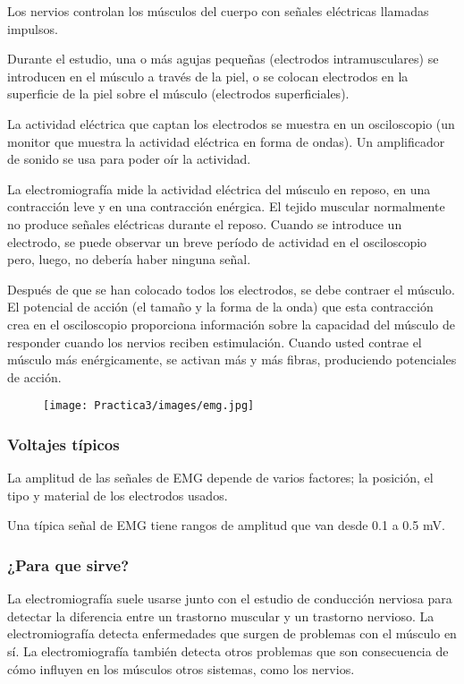 \documentclass[12pt]{article}
\begin{document}
	Los nervios controlan los músculos del cuerpo con señales eléctricas llamadas impulsos. 
	
	Durante el estudio, una o más agujas pequeñas (electrodos intramusculares) se introducen en el músculo a través de la piel, o se colocan electrodos en la superficie de la piel sobre el músculo (electrodos superficiales). 
	
	La actividad eléctrica que captan los electrodos se muestra en un osciloscopio (un monitor que muestra la actividad eléctrica en forma de ondas). Un amplificador de sonido se usa para poder oír la actividad.
	
	La electromiografía mide la actividad eléctrica del músculo en reposo, en una contracción leve y en una contracción enérgica. El tejido muscular normalmente no produce señales eléctricas durante el reposo. Cuando se introduce un electrodo, se puede observar un breve período de actividad en el osciloscopio pero, luego, no debería haber ninguna señal.
	
	Después de que se han colocado todos los electrodos, se debe contraer el músculo. El potencial de acción (el tamaño y la forma de la onda) que esta contracción crea en el osciloscopio proporciona información sobre la capacidad del músculo de responder cuando los nervios reciben estimulación. Cuando usted contrae el músculo más enérgicamente, se activan más y más fibras, produciendo potenciales de acción.
	
	\begin{figure}[h!]
                \centering
                \texttt{[image: Practica3/images/emg.jpg]}
    \end{figure} 
    
    \subsubsection{Voltajes típicos}
    La amplitud de las señales de EMG depende de varios factores; la posición, el tipo y material de los electrodos usados.
    
    Una típica señal de EMG tiene rangos de amplitud que van desde 0.1 a 0.5 mV. 
    
    \subsubsection{¿Para que sirve?}
    La electromiografía suele usarse junto con el estudio de conducción nerviosa para detectar la diferencia entre un trastorno muscular y un trastorno nervioso. La electromiografía detecta enfermedades que surgen de problemas con el músculo en sí. La electromiografía también detecta otros problemas que son consecuencia de cómo influyen en los músculos otros sistemas, como los nervios.
    
\end{document}
